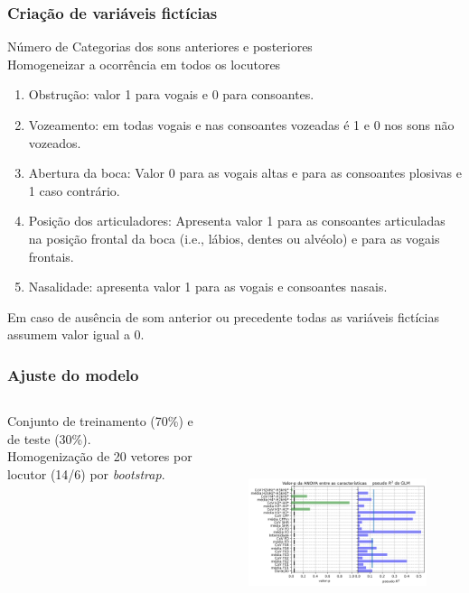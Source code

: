 \documentclass[121pt, aspectratio=169, t]{beamer}
\begin{document}
\begin{frame}[fragile=singleslide]
	\frametitle{Criação de variáveis fictícias}
	Número de Categorias dos sons anteriores e posteriores\\
	
	Homogeneizar a ocorrência em todos os locutores\\
	
	\begin{enumerate}
		\item Obstrução: valor 1 para vogais e 0 para consoantes.
		\item Vozeamento: em todas vogais e nas consoantes vozeadas é 1 e 0 nos sons não
		vozeados.
		\item Abertura da boca: Valor 0 para as vogais altas e para as consoantes plosivas e 1 caso contrário.
		\item Posição dos articuladores: Apresenta valor 1 para as consoantes articuladas na posição frontal da boca (i.e., lábios, dentes ou alvéolo) e para as vogais frontais.
		\item Nasalidade: apresenta valor 1 para as vogais e consoantes nasais.
	\end{enumerate}
	Em caso de ausência de som anterior ou precedente todas as variáveis fictícias assumem valor igual a 0.
\end{frame}

\begin{frame}[fragile=singleslide]
	\frametitle{Ajuste do modelo}
	\begin{columns}
		\begin{column}{0.25\textwidth}
			Conjunto de treinamento (70\%) e de teste (30\%).\\
			\vspace{0.5cm}
			Homogenização de 20 vetores por locutor (14/6) por \textit{bootstrap}.
		\end{column}
		\begin{column}{0.75\textwidth}  %
				\vspace{-1.5cm}
				\begin{figure}
				\centering
				\includegraphics[height=7cm]{pValue_ANOVA_features.png}
			\end{figure}
		\end{column}
	\end{columns}
\end{frame}
\end{document}
